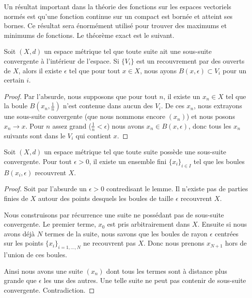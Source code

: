 Un résultat important dans la théorie des fonctions sur les espaces vectoriels normés est qu'une fonction continue sur un compact est bornée et atteint ses bornes. Ce résultat sera énormément utilisé pour trouver des maximums et minimums de fonctions. Le théorème exact est le suivant.

\begin{lemma}    \label{LemQFXOWyx}
	Soit \( (X,d)\) un espace métrique tel que toute suite ait une sous-suite convergente à l'intérieur de l'espace. Si \( \{ V_i \}\) est un recouvrement par des ouverts de \( X\), alors il existe \( \epsilon\) tel que pour tout \( x\in X\), nous ayons \( B(x,\epsilon)\subset V_i\) pour un certain \( i\).
\end{lemma}

\begin{proof}
	Par l'absurde, nous supposons que pour tout \( n\), il existe un \( x_n\in X\) tel que la boule \( B(x_n,\frac{1}{ n })\) n'est contenue dans aucun des \( V_i\). De ces \( x_n\), nous extrayons une sous-suite convergente (que nous nommons encore \( (x_n)\)) et nous posons \( x_n\to x\). Pour \( n\) assez grand (\( \frac{1}{ n }<\epsilon\)) nous avons \( x_n\in B(x,\epsilon)\), donc tous les \( x_n\) suivants sont dans le \( V_i\) qui contient \( x\).
\end{proof}

\begin{lemma}   \label{LemMGQqgDG}
	Soit \( (X,d)\) un espace métrique tel que toute suite possède une sous-suite convergente. Pour tout \( \epsilon>0\), il existe un ensemble fini \( \{ x_i \}_{i\in I}\) tel que les boules \( B(x_i,\epsilon)\) recouvrent \( X\).
\end{lemma}

\begin{proof}
	Soit par l'absurde un \( \epsilon>0\) contredisant le lemme. Il n'existe pas de parties finies de \( X\) autour des points desquels les boules de taille \( \epsilon\) recouvrent \( X\).

	Nous construisons par récurrence une suite ne possédant pas de sous-suite convergente. Le premier terme, \( x_0\) est pris arbitrairement dans \( X\). Ensuite si nous avons déjà \( N\) termes de la suite, nous savons que les boules de rayon \( \epsilon\) centrées sur les points \( \{ x_i \}_{i=1,\ldots, N}\) ne recouvrent pas \( X\). Donc nous prenons \( x_{N+1}\) hors de l'union de ces boules.

	Ainsi nous avons une suite \( (x_n)\) dont tous les termes sont à distance plus grande que \( \epsilon\) les uns des autres. Une telle suite ne peut pas contenir de sous-suite convergente. Contradiction.
\end{proof}

